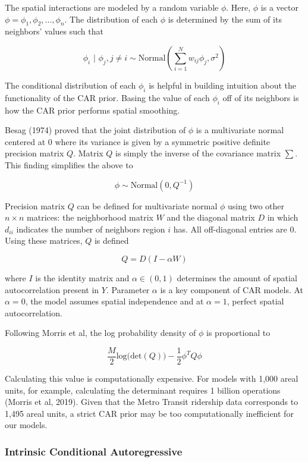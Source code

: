 \documentclass[
]{article}
\begin{document}
The spatial interactions are modeled by a random variable \(\phi\).
Here, \(\phi\) is a vector \(\phi = \phi_1, \phi_2, ..., \phi_n\). The
distribution of each \(\phi\) is determined by the sum of its neighbors'
values such that

\[
\phi_i \text{ | } \phi_j, j \neq i \sim \text{Normal}(\sum_{i=1}^{N}w_{ij}\phi_j, \sigma^2) 
\]

The conditional distribution of each \(\phi_i\) is helpful in building
intuition about the functionality of the CAR prior. Basing the value of
each \(\phi_i\) off of its neighbors is how the CAR prior performs
spatial smoothing.

Besag (1974) proved that the joint distribution of \(\phi\) is a
multivariate normal centered at 0 where its variance is given by a
symmetric positive definite precision matrix \(Q\). Matrix \(Q\) is
simply the inverse of the covariance matrix \(\sum\). This finding
simplifies the above to

\[
\phi \sim \text{Normal}(0, Q^{-1})
\]

Precision matrix \(Q\) can be defined for multivariate normal \(\phi\)
using two other \(n \times n\) matrices: the neighborhood matrix \(W\)
and the diagonal matrix \(D\) in which \(d_{ii}\) indicates the number
of neighbors region \(i\) has. All off-diagonal entries are 0. Using
these matrices, \(Q\) is defined

\[
Q = D(I - \alpha W)
\]

where \(I\) is the identity matrix and \(\alpha \in (0, 1)\) determines
the amount of spatial autocorrelation present in \(Y\). Parameter
\(\alpha\) is a key component of CAR models. At \(\alpha = 0\), the
model assumes spatial independence and at \(\alpha = 1\), perfect
spatial autocorrelation.

Following Morris et al, the log probability density of \(\phi\) is
proportional to

\[
\frac{M}{2}\text{log(det}(Q)) - \frac{1}{2}\phi^TQ\phi
\]

Calculating this value is computationally expensive. For models with
1,000 areal units, for example, calculating the determinant requires 1
billion operations (Morris et al, 2019). Given that the Metro Transit
ridership data corresponds to 1,495 areal units, a strict CAR prior may
be too computationally inefficient for our models.

\hypertarget{intrinsic-conditional-autoregressive}{%
\subsubsection{Intrinsic Conditional
Autoregressive}\label{intrinsic-conditional-autoregressive}}
\end{document}
